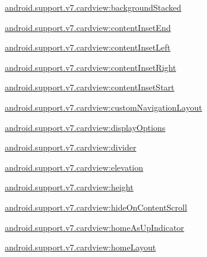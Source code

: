 {\ttfamily \hyperlink{classandroid_1_1support_1_1v7_1_1cardview_1_1R_1_1styleable_ae8cef0aa1d4b10f1ae6ef92ca895778d}{android.\+support.\+v7.\+cardview\+:background\+Stacked}}

{\ttfamily \hyperlink{classandroid_1_1support_1_1v7_1_1cardview_1_1R_1_1styleable_ac13a0473d17683dad10beff0e1f9627b}{android.\+support.\+v7.\+cardview\+:content\+Inset\+End}}

{\ttfamily \hyperlink{classandroid_1_1support_1_1v7_1_1cardview_1_1R_1_1styleable_a25616fd348d614fe488889ce0079c9e9}{android.\+support.\+v7.\+cardview\+:content\+Inset\+Left}}

{\ttfamily \hyperlink{classandroid_1_1support_1_1v7_1_1cardview_1_1R_1_1styleable_aa43e0bb7411ac41bac49b12fad85a806}{android.\+support.\+v7.\+cardview\+:content\+Inset\+Right}}

{\ttfamily \hyperlink{classandroid_1_1support_1_1v7_1_1cardview_1_1R_1_1styleable_a7e19145090b9eaa2625e1b3640a6d252}{android.\+support.\+v7.\+cardview\+:content\+Inset\+Start}}

{\ttfamily \hyperlink{classandroid_1_1support_1_1v7_1_1cardview_1_1R_1_1styleable_a93ac940816d8b8b67d888d7020292361}{android.\+support.\+v7.\+cardview\+:custom\+Navigation\+Layout}}

{\ttfamily \hyperlink{classandroid_1_1support_1_1v7_1_1cardview_1_1R_1_1styleable_a87d39d276949634b87ffd4dd7d2579d2}{android.\+support.\+v7.\+cardview\+:display\+Options}}

{\ttfamily \hyperlink{classandroid_1_1support_1_1v7_1_1cardview_1_1R_1_1styleable_ae505313e35211856966cf984c33181c7}{android.\+support.\+v7.\+cardview\+:divider}}

{\ttfamily \hyperlink{classandroid_1_1support_1_1v7_1_1cardview_1_1R_1_1styleable_aec9fae25c89bd5a070600e38f0b55df7}{android.\+support.\+v7.\+cardview\+:elevation}}

{\ttfamily \hyperlink{classandroid_1_1support_1_1v7_1_1cardview_1_1R_1_1styleable_a74f979f83ff003dd9a26ebab6879a480}{android.\+support.\+v7.\+cardview\+:height}}

{\ttfamily \hyperlink{classandroid_1_1support_1_1v7_1_1cardview_1_1R_1_1styleable_a32617ba8acd97d7f15aad540e355800d}{android.\+support.\+v7.\+cardview\+:hide\+On\+Content\+Scroll}}

{\ttfamily \hyperlink{classandroid_1_1support_1_1v7_1_1cardview_1_1R_1_1styleable_af771f315212061116d74e39926bb0c86}{android.\+support.\+v7.\+cardview\+:home\+As\+Up\+Indicator}}

{\ttfamily \hyperlink{classandroid_1_1support_1_1v7_1_1cardview_1_1R_1_1styleable_adb2700c3e0cd5e075ed4921d7c014d2b}{android.\+support.\+v7.\+cardview\+:home\+Layout}}

